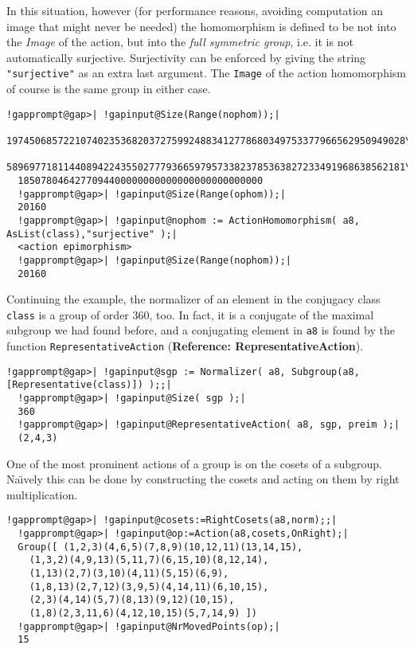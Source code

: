 \documentclass[a4paper,11pt]{report}
\begin{document}
{{ In this situation, however (for performance reasons, avoiding computation an
image that might never be needed) the homomorphism is defined to be not into
the \emph{Image} of the action, but into the \emph{full symmetric group}, i.e. it is not automatically surjective. Surjectivity can be enforced by
giving the string \texttt{"surjective"} as an extra last argument. The \texttt{Image} of the action homomorphism of course is the same group in either case. 
\begin{Verbatim}[commandchars=!@|,fontsize=\small,frame=single,label=Example]
  !gapprompt@gap>| !gapinput@Size(Range(nophom));|
  1974506857221074023536820372759924883412778680349753377966562950949028\
  5896977181144089422435502777936659795733823785363827233491968638562181\
  1850780464277094400000000000000000000000000
  !gapprompt@gap>| !gapinput@Size(Range(ophom));|
  20160
  !gapprompt@gap>| !gapinput@nophom := ActionHomomorphism( a8, AsList(class),"surjective" );|
  <action epimorphism>
  !gapprompt@gap>| !gapinput@Size(Range(nophom));|
  20160
\end{Verbatim}
 

 Continuing the example, the normalizer of an element in the conjugacy class \texttt{class} is a group of order 360, too. In fact, it is a conjugate of the maximal
subgroup we had found before, and a conjugating element in \texttt{a8} is found by the function \texttt{RepresentativeAction} (\textbf{Reference: RepresentativeAction}). 

 
\begin{Verbatim}[commandchars=!@|,fontsize=\small,frame=single,label=Example]
  !gapprompt@gap>| !gapinput@sgp := Normalizer( a8, Subgroup(a8,[Representative(class)]) );;|
  !gapprompt@gap>| !gapinput@Size( sgp );|
  360
  !gapprompt@gap>| !gapinput@RepresentativeAction( a8, sgp, preim );|
  (2,4,3)
\end{Verbatim}
                

      One of the most prominent actions of a group is on the cosets of a subgroup.
Na{\"\i}vely this can be done by constructing the cosets and acting on them by
right multiplication. 
\begin{Verbatim}[commandchars=!@|,fontsize=\small,frame=single,label=Example]
  !gapprompt@gap>| !gapinput@cosets:=RightCosets(a8,norm);;|
  !gapprompt@gap>| !gapinput@op:=Action(a8,cosets,OnRight);|
  Group([ (1,2,3)(4,6,5)(7,8,9)(10,12,11)(13,14,15), 
    (1,3,2)(4,9,13)(5,11,7)(6,15,10)(8,12,14), 
    (1,13)(2,7)(3,10)(4,11)(5,15)(6,9), 
    (1,8,13)(2,7,12)(3,9,5)(4,14,11)(6,10,15), 
    (2,3)(4,14)(5,7)(8,13)(9,12)(10,15), 
    (1,8)(2,3,11,6)(4,12,10,15)(5,7,14,9) ])
  !gapprompt@gap>| !gapinput@NrMovedPoints(op);|
  15
\end{Verbatim}
 

}}
\end{document}
